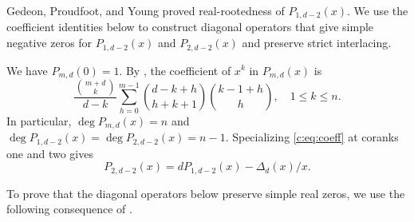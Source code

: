 \documentclass[11pt]{article}
\numberwithin{equation}{section}
\theoremstyle{remark}\newtheorem{remark}[theorem]{Remark}
\begin{document}
Gedeon, Proudfoot, and Young \cite[Theorem~3.3]{GPY} proved
real-rootedness of $P_{1,d-2}(x)$. We use the coefficient identities
below to construct diagonal operators that give simple negative zeros for
$P_{1,d-2}(x)$ and $P_{2,d-2}(x)$ and preserve strict interlacing.

We have $P_{m,d}(0)=1$. By \cite[Theorem 1.3]{GLXYZ}, the coefficient
of $x^k$ in $P_{m,d}(x)$ is
\begin{equation}\label{c:eq:coeff}
 \frac{\binom{m+d}{k}}{d-k}
 \sum_{h=0}^{m-1}\binom{d-k+h}{h+k+1}\binom{k-1+h}{h},
 \quad1\le k\le n.
\end{equation}
In particular, $\deg P_{m,d}(x)=n$ and
$\deg P_{1,d-2}(x)=\deg P_{2,d-2}(x)=n-1$.
Specializing \eqref{c:eq:coeff} at coranks one and two gives
\begin{equation}\label{c:eq:Kidentity}
 P_{2,d-2}(x)=dP_{1,d-2}(x)-\Delta_d(x)/x.
\end{equation}

To prove that the diagonal operators below preserve simple real
zeros, we use the following consequence of
\cite[Theorem 3.1]{CC}.
\end{document}
